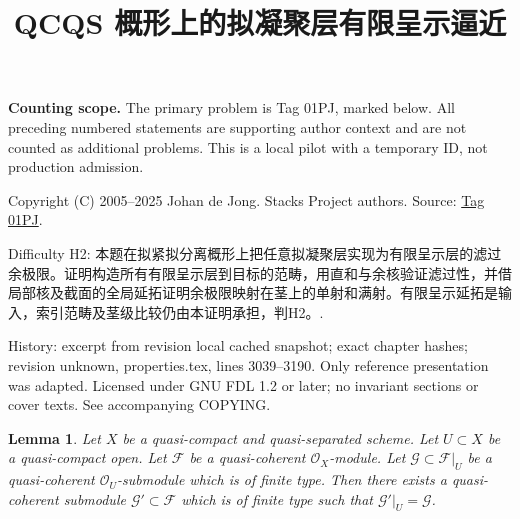 \documentclass{amsart}
\theoremstyle{plain}
\newtheorem{lemma}[subsection]{Lemma}
\theoremstyle{definition}
\theoremstyle{remark}
\numberwithin{equation}{subsection}
\begin{document}
\title[Stacks Project, Tag 01PJ]{QCQS 概形上的拟凝聚层有限呈示逼近}
\maketitle
\noindent\textbf{Counting scope.} The primary problem is Tag 01PJ, marked below. All preceding numbered statements are supporting author context and are not counted as additional problems. This is a local pilot with a temporary ID, not production admission.


\noindent Copyright (C) 2005--2025 Johan de Jong. Stacks Project authors. Source: \href{https://stacks.math.columbia.edu/tag/01PJ}{Tag 01PJ}.

\noindent Difficulty H2: 本题在拟紧拟分离概形上把任意拟凝聚层实现为有限呈示层的滤过余极限。证明构造所有有限呈示层到目标的范畴，用直和与余核验证滤过性，并借局部核及截面的全局延拓证明余极限映射在茎上的单射和满射。有限呈示延拓是输入，索引范畴及茎级比较仍由本证明承担，判H2。.

\noindent History: excerpt from revision local cached snapshot; exact chapter hashes; revision unknown, properties.tex, lines 3039--3190. Only reference presentation was adapted. Licensed under GNU FDL 1.2 or later; no invariant sections or cover texts. See accompanying COPYING.

\begin{lemma}
\label{lemma-extend}
Let $X$ be a quasi-compact and quasi-separated scheme.
Let $U \subset X$ be a quasi-compact open.
Let $\mathcal{F}$ be a quasi-coherent $\mathcal{O}_X$-module.
Let $\mathcal{G} \subset \mathcal{F}|_U$ be a quasi-coherent
$\mathcal{O}_U$-submodule which is of finite type. Then
there exists a quasi-coherent submodule $\mathcal{G}' \subset \mathcal{F}$
which is of finite type such that $\mathcal{G}'|_U = \mathcal{G}$.
\end{lemma}
\end{document}
